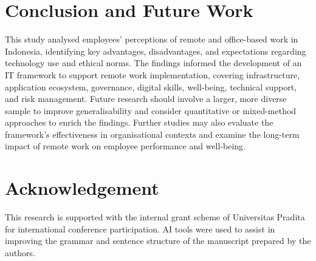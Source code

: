 \documentclass[conference]{IEEEtran}
\begin{document}
\section{Conclusion and Future Work}

This study analysed employees' perceptions of remote and office-based work in Indonesia, identifying key advantages, disadvantages, and expectations regarding technology use and ethical norms. The findings informed the development of an IT framework to support remote work implementation, covering infrastructure, application ecosystem, governance, digital skills, well-being, technical support, and risk management. Future research should involve a larger, more diverse sample to improve generalisability and consider quantitative or mixed-method approaches to enrich the findings. Further studies may also evaluate the framework's effectiveness in organisational contexts and examine the long-term impact of remote work on employee performance and well-being.

\section*{Acknowledgement}

This research is supported with the internal grant scheme of Universitas Pradita for international conference participation. AI tools were used to assist in improving the grammar and sentence structure of the manuscript prepared by the authors.



\end{document}
